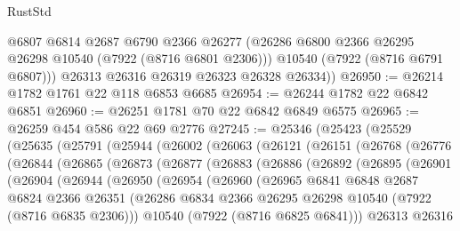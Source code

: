 \begin{lexlean}{RustStd}
\begin{coremodule}
          @6807
          @6814
          @2687
          @6790
          @2366
          @26277
          (@26286 @6800 @2366 @26295 @26298 @10540 (@7922 (@8716 @6801 @2306)))
          @10540
          (@7922 (@8716 @6791 @6807)))
        @26313
        @26316
        @26319
        @26323
        @26328
        @26334))
@26950 := @26214 @1782 @1761 @22 @118 @6853 @6685
@26954 := @26244 @1782 @22 @6842 @6851
@26960 := @26251 @1781 @70 @22 @6842 @6849 @6575
@26965 := @26259 @454 @586 @22 @69 @2776
@27245 := @25346
    (@25423
      (@25529
        (@25635
          (@25791
            (@25944
              (@26002
                (@26063
                  (@26121
                    (@26151
                      (@26768
                        (@26776
                          (@26844
                            (@26865
                              (@26873
                                (@26877
                                  (@26883
                                    (@26886
                                      (@26892
                                        (@26895
                                          (@26901
                                            (@26904
                                              (@26944
                                                (@26950
                                                  (@26954
                                                    (@26960
                                                      (@26965
                                                        @6841
                                                        @6848
                                                        @2687
                                                        @6824
                                                        @2366
                                                        @26351
                                                        (@26286
                                                          @6834
                                                          @2366
                                                          @26295
                                                          @26298
                                                          @10540
                                                          (@7922 (@8716 @6835 @2306)))
                                                        @10540
                                                        (@7922 (@8716 @6825 @6841)))
                                                      @26313
                                                      @26316

\end{coremodule}
\end{lexlean}
